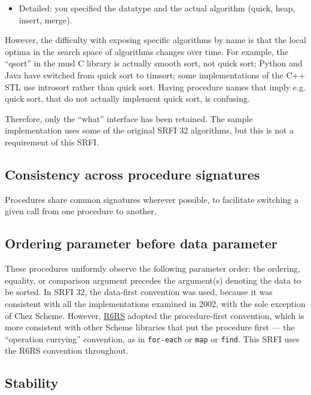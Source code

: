 \begin{itemize}
\tightlist
\item
  Detailed: you specified the datatype and the actual algorithm (quick,
  heap, insert, merge).
\end{itemize}

However, the difficulty with exposing specific algorithms by name is
that the local optima in the search space of algorithms changes over
time. For example, the ``qsort'' in the musl C library is actually
smooth sort, not quick sort; Python and Java have switched from quick
sort to timsort; some implementations of the C++ STL use introsort
rather than quick sort. Having procedure names that imply e.g. quick
sort, that do not actually implement quick sort, is confusing.

Therefore, only the ``what'' interface has been retained. The sample
implementation uses some of the original SRFI 32 algorithms, but this is
not a requirement of this SRFI.

\subsection{Consistency across procedure
signatures}\label{Consistencyacrossproceduresignatures}

Procedures share common signatures wherever possible, to facilitate
switching a given call from one procedure to another.

\subsection{Ordering parameter before data
parameter}\label{Orderingparameterbeforedataparameter}

These procedures uniformly observe the following parameter order: the
ordering, equality, or comparison argument precedes the argument(s)
denoting the data to be sorted. In SRFI 32, the data-first convention
was used, because it was consistent with all the implementations
examined in 2002, with the sole exception of Chez Scheme. However,
\href{http://www.r6rs.org/final/html/r6rs-lib/r6rs-lib-Z-H-5.html\#node_chap_4}{R6RS}
adopted the procedure-first convention, which is more consistent with
other Scheme libraries that put the procedure first --- the ``operation
currying'' convention, as in \texttt{for-each} or \texttt{map} or
\texttt{find}. This SRFI uses the R6RS convention throughout.

\subsection{Stability}\label{Stability}

